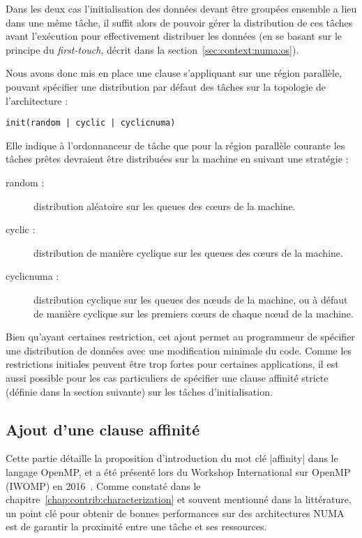 Dans les deux cas l'initialisation des données devant être groupées ensemble a lieu dans une même tâche, il suffit alors de pouvoir gérer la distribution de ces tâches avant l'exécution pour effectivement distribuer les données (en se basant sur le principe du \emph{first-touch}, décrit dans la section~\ref{sec:context:numa:os}).

Nous avons donc mis en place une clause s'appliquant sur une région parallèle, pouvant spécifier une distribution par défaut des tâches sur la topologie de l'architecture :

\begin{lstlisting}
init(random | cyclic | cyclicnuma)
\end{lstlisting}

Elle indique à l'ordonnanceur de tâche que pour la région parallèle courante les tâches prêtes devraient être distribuées sur la machine en suivant une stratégie :

\begin{description}
  \item [random :]
    distribution aléatoire sur les queues des cœurs de la machine.
  \item [cyclic :]
    distribution de manière cyclique sur les queues des cœurs de la machine.
  \item [cyclicnuma :]
    distribution cyclique sur les queues des nœuds de la machine, ou à défaut de manière cyclique sur les premiers cœurs de chaque nœud de la machine.
\end{description}


Bien qu'ayant certaines restriction, cet ajout permet au programmeur de spécifier une distribution de données avec une modification minimale du code.
Comme les restrictions initiales peuvent être trop fortes pour certaines applications, il est aussi possible pour les cas particuliers de spécifier une clause affinité stricte (définie dans la section suivante) sur les tâches d'initialisation.

\subsection{Ajout d'une clause affinité}\label{sec:openmp:langage:affinity}

Cette partie détaille la proposition d'introduction du mot clé |affinity| dans le langage OpenMP, et a été présenté lors du Workshop International sur OpenMP (IWOMP) en 2016~\cite{Virouleau2016b}.
Comme constaté dans le chapitre~\ref{chap:contrib:characterization} et souvent mentionné dans la littérature, un point clé pour obtenir de bonnes performances sur des architectures NUMA est de garantir la proximité entre une tâche et ses ressources.

